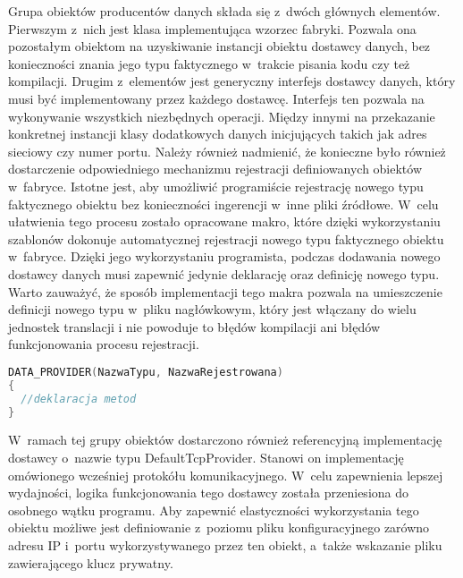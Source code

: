 Grupa obiektów producentów danych składa się z~dwóch głównych
elementów. Pierwszym z~nich jest klasa implementująca wzorzec
fabryki. Pozwala ona pozostałym obiektom na uzyskiwanie instancji
obiektu dostawcy danych, bez konieczności znania jego typu faktycznego
w~trakcie pisania kodu czy też kompilacji. Drugim z~elementów jest
generyczny interfejs dostawcy danych, który musi być implementowany
przez każdego dostawcę. Interfejs ten pozwala na wykonywanie
wszystkich niezbędnych operacji. Między innymi na przekazanie
konkretnej instancji klasy dodatkowych danych inicjujących takich jak
adres sieciowy czy numer portu. Należy również nadmienić, że konieczne
było również dostarczenie odpowiedniego mechanizmu rejestracji
definiowanych obiektów w~fabryce. Istotne jest, aby umożliwić
programiście rejestrację nowego typu faktycznego obiektu bez
konieczności ingerencji w~inne pliki źródłowe. W~celu ułatwienia tego
procesu zostało opracowane makro, które dzięki wykorzystaniu szablonów
dokonuje automatycznej rejestracji nowego typu faktycznego obiektu
w~fabryce. Dzięki jego wykorzystaniu programista, podczas dodawania
nowego dostawcy danych musi zapewnić jedynie deklarację oraz definicję
nowego typu. Warto zauważyć, że sposób implementacji tego makra
pozwala na umieszczenie definicji nowego typu w~pliku nagłówkowym,
który jest włączany do wielu jednostek translacji i nie powoduje to
błędów kompilacji ani błędów funkcjonowania procesu rejestracji.

\vspace{0.5cm}
\begin{minipage}{\textwidth}
\begin{lstlisting}[language=c++, caption=Definicja dostawcy danych, linewidth=10cm]
DATA_PROVIDER(NazwaTypu, NazwaRejestrowana)
{
  //deklaracja metod
}
\end{lstlisting}
\end{minipage}
\vspace{0.5cm}

W~ramach tej grupy obiektów dostarczono również referencyjną
implementację dostawcy o~nazwie typu DefaultTcpProvider. Stanowi on
implementację omówionego wcześniej protokółu komunikacyjnego. W~celu
zapewnienia lepszej wydajności, logika funkcjonowania tego dostawcy
została przeniesiona do osobnego wątku programu. Aby zapewnić
elastyczności wykorzystania tego obiektu możliwe jest definiowanie
z~poziomu pliku konfiguracyjnego zarówno adresu IP i~portu
wykorzystywanego przez ten obiekt, a~także wskazanie pliku
zawierającego klucz prywatny.

